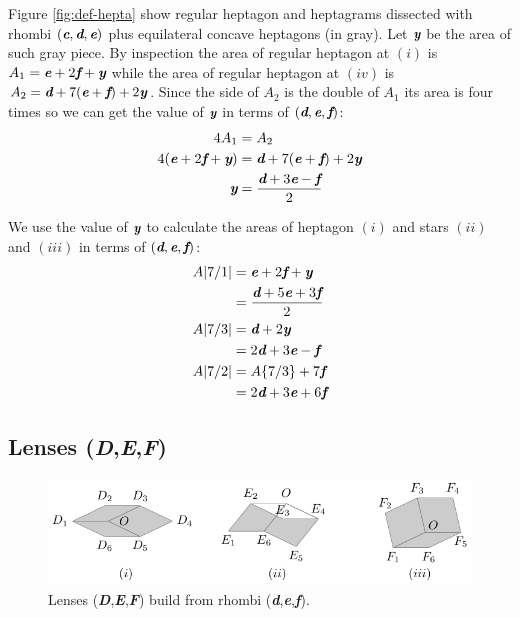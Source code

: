 \documentclass[11pt]{article}
\def\mathbi#1{\textbf{\em #1}}
\begin{document}
Figure \ref{fig:def-hepta} show regular heptagon and heptagrams dissected with rhombi $(\mathbi{c},\mathbi{d},\mathbi{e})$ plus equilateral concave heptagons (in gray). Let $\mathbi{y}$ be the area of such gray piece. By inspection the area of regular heptagon at $(i)$ is $A_1 = \mathbi{e} + 2\mathbi{f} + \mathbi{y}$ while the area of regular heptagon at $(iv)$ is $A_2 = \mathbi{d} + 7(\mathbi{e}+\mathbi{f}) + 2\mathbi{y}$. Since the side of $A_2$ is the double of $A_1$ its area is four times so we can get the value of $\mathbi{y}$ in terms of $(\mathbi{d},\mathbi{e},\mathbi{f})$:
\begin{align}
4A_1 &= A_2 \nonumber\\
4(\mathbi{e} + 2\mathbi{f} + \mathbi{y}) &= \mathbi{d} + 7(\mathbi{e}+\mathbi{f}) + 2\mathbi{y} \nonumber\\
\mathbi{y} &= \frac{\mathbi{d} + 3\mathbi{e} - \mathbi{f}}2
\end{align}

We use the value of $\mathbi{y}$ to calculate the areas of heptagon $(i)$ and stars $(ii)$ and $(iii)$ in terms of $(\mathbi{d},\mathbi{e},\mathbi{f})$:
\begin{align}
A|7/1| &= \mathbi{e} + 2\mathbi{f} + \mathbi{y} \nonumber\\
    &= \frac{\mathbi{d} + 5\mathbi{e} + 3\mathbi{f}}2 \\
A|7/3| &= \mathbi{d} + 2\mathbi{y} \nonumber\\
 &= 2\mathbi{d} + 3\mathbi{e} - \mathbi{f} \\
A|7/2| &= A\{7/3\} + 7\mathbi{f} \nonumber\\
 &= 2\mathbi{d} + 3\mathbi{e} + 6\mathbi{f}
\end{align}

\subsection{Lenses (\mathbi{D},\mathbi{E},\mathbi{F})}

\begin{figure}[H]
\centering
\includegraphics[scale=1.1]{def/def}
\caption{Lenses (\mathbi{D},\mathbi{E},\mathbi{F}) build from rhombi (\mathbi{d},\mathbi{e},\mathbi{f}).}
\label{fig:def-hexagons}
\end{figure}
\end{document}
